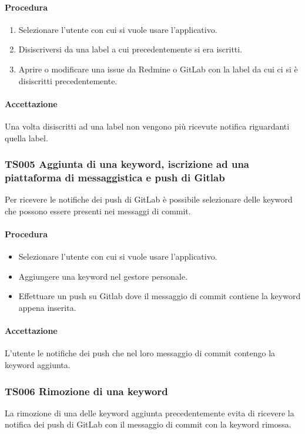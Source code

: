 		\paragraph*{Procedura}
			\begin{enumerate}
				\item Selezionare l'utente con cui si vuole usare l'applicativo.
				\item Disiscriversi da una label a cui precedentemente si era iscritti.
				\item Aprire o modificare una issue da Redmine o GitLab con la label da cui ci si è disiscritti precedentemente.
			\end{enumerate}
		
		\paragraph*{Accettazione}
		Una volta disiscritti ad una label non vengono più ricevute notifica riguardanti quella label.
		
	\subsubsection{TS005 Aggiunta di una keyword, iscrizione ad una piattaforma di messaggistica e push di Gitlab}
		Per ricevere le notifiche dei push di GitLab è possibile selezionare delle keyword che possono essere presenti nei messaggi di commit.
		
		\paragraph*{Procedura}
		\begin{itemize}
			\item Selezionare l'utente con cui si vuole usare l'applicativo.
			\item Aggiungere una keyword nel gestore personale.
			\item Effettuare un push su Gitlab dove il messaggio di commit contiene la keyword appena inserita.
		\end{itemize}
	
		\paragraph*{Accettazione}
		L'utente le notifiche dei push che nel loro messaggio di commit contengo la keyword aggiunta.
	
	\subsubsection{TS006 Rimozione di una keyword}
		La rimozione di una delle keyword aggiunta precedentemente evita di ricevere la notifica dei push di GitLab con il messaggio di commit con la keyword rimossa.
		
